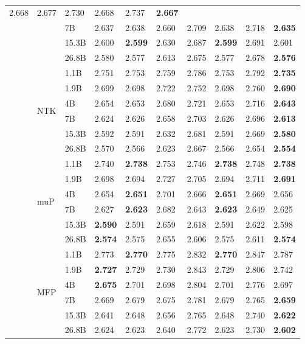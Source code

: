 \documentclass{article}
\theoremstyle{plain}
\theoremstyle{definition}
\theoremstyle{remark}
\begin{document}
\begin{table}[h!]
{\begin{tabularx}{1.65\textwidth}{XXX | XXXXXXX}
2.668 & 2.677 & 2.730 & 2.668 & 2.737 & \textbf{2.667} \\ &  & 7B & 2.637 & 2.638 & 2.660 & 2.709 & 2.638 & 2.718 & \textbf{2.635} \\ &  & 15.3B & 2.600 & \textbf{2.599} & 2.630 & 2.687 & \textbf{2.599} & 2.691 & 2.601 \\ &  & 26.8B & 2.580 & 2.577 & 2.613 & 2.675 & 2.577 & 2.678 & \textbf{2.576} \\  \cmidrule{2-10}  & \multirow{6}{*}{\Large NTK } & 1.1B & 2.751 & 2.753 & 2.759 & 2.786 & 2.753 & 2.792 & \textbf{2.735} \\ &  & 1.9B & 2.699 & 2.698 & 2.722 & 2.752 & 2.698 & 2.760 & \textbf{2.690} \\ &  & 4B & 2.654 & 2.653 & 2.680 & 2.721 & 2.653 & 2.716 & \textbf{2.643} \\ &  & 7B & 2.624 & 2.626 & 2.658 & 2.703 & 2.626 & 2.696 & \textbf{2.613} \\ &  & 15.3B & 2.592 & 2.591 & 2.632 & 2.681 & 2.591 & 2.669 & \textbf{2.580} \\ &  & 26.8B & 2.570 & 2.566 & 2.623 & 2.667 & 2.566 & 2.654 & \textbf{2.554} \\  \cmidrule{2-10}  & \multirow{6}{*}{\Large muP } & 1.1B & 2.740 & \textbf{2.738} & 2.753 & 2.746 & \textbf{2.738} & 2.748 & \textbf{2.738} \\ &  & 1.9B & 2.698 & 2.694 & 2.727 & 2.705 & 2.694 & 2.711 & \textbf{2.691} \\ &  & 4B & 2.654 & \textbf{2.651} & 2.701 & 2.666 & \textbf{2.651} & 2.669 & 2.656 \\ &  & 7B & 2.627 & \textbf{2.623} & 2.682 & 2.643 & \textbf{2.623} & 2.649 & 2.625 \\ &  & 15.3B & \textbf{2.590} & 2.591 & 2.659 & 2.618 & 2.591 & 2.622 & 2.598 \\ &  & 26.8B & \textbf{2.574} & 2.575 & 2.655 & 2.606 & 2.575 & 2.611 & \textbf{2.574} \\  \cmidrule{2-10}  & \multirow{6}{*}{\Large MFP } & 1.1B & 2.773 & \textbf{2.770} & 2.775 & 2.832 & \textbf{2.770} & 2.847 & 2.787 \\ &  & 1.9B & \textbf{2.727} & 2.729 & 2.730 & 2.843 & 2.729 & 2.806 & 2.742 \\ &  & 4B & \textbf{2.675} & 2.701 & 2.698 & 2.804 & 2.701 & 2.776 & 2.697 \\ &  & 7B & 2.669 & 2.679 & 2.675 & 2.781 & 2.679 & 2.765 & \textbf{2.659} \\ &  & 15.3B & 2.641 & 2.648 & 2.656 & 2.765 & 2.648 & 2.740 & \textbf{2.622} \\ &  & 26.8B & 2.624 & 2.623 & 2.640 & 2.772 & 2.623 & 2.730 & \textbf{2.602} \\ 
\bottomrule[1.5\heavyrulewidth]
\end{tabularx}}
\end{table}
\endgroup
\end{document}
